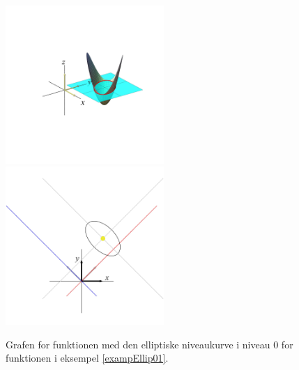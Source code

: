\begin{figure}[ht]
\centerline{  \includegraphics[height=60mm]{FIGS/plot2DNivEllipLift01.pdf} \includegraphics[height=60mm]{FIGS/plotEllipKvad01.pdf}}
\begin{center}
\caption{Grafen for funktionen med den elliptiske niveaukurve i niveau $0$ for funktionen i eksempel \ref{exampEllip01}.} \label{figEllip01Kvad}
\end{center}
\end{figure}


